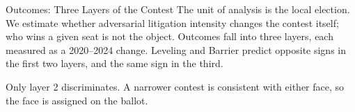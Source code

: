 
\begin{frame}{Outcomes: Three Layers of the Contest}
\hypertarget{src:outcomes}{}
\small
The unit of analysis is the local election. We estimate whether adversarial litigation intensity changes the contest itself; who wins a given seat is not the object. Outcomes fall into three layers, each measured as a 2020--2024 change. Leveling and Barrier predict opposite signs in the first two layers, and the same sign in the third.
\vspace{10pt}
\begin{center}
\renewcommand{\arraystretch}{1.7}
\end{center}
\vspace{10pt}
{\centering\footnotesize Only layer 2 discriminates. A narrower contest is consistent with either face, so the face is assigned on the ballot.\par}
\end{frame}
